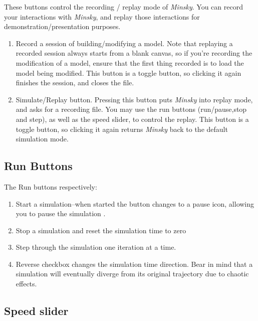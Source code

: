 \label{RecReplayButtons}


These buttons control the recording / replay mode of \emph{Minsky}.
You can record your interactions with \emph{Minsky}, and replay those
interactions for demonstration/presentation purposes.
\begin{enumerate}
\item Record a session of building/modifying a model. Note that replaying
a recorded session always starts from a blank canvas, so if you're
recording the modification of a model, ensure that the first thing
recorded is to load the model being modified. This button is a toggle
button, so clicking it again finishes the session, and closes the
file. 
\item Simulate/Replay button. Pressing this button puts \emph{Minsky} into
replay mode, and asks for a recording file. You may use the run buttons
(run/pause,stop and step), as well as the speed slider, to control
the replay. This button is a toggle button, so clicking it again returns
\emph{Minsky} back to the default simulation mode. 
\end{enumerate}

\subsection{Run Buttons}

\label{RunButtons}


The Run buttons respectively: 
\begin{enumerate}
\item Start a simulation--when started the button changes to a pause icon,
allowing you to pause the simulation . 
\item Stop a simulation and reset the simulation time to zero 
\item Step through the simulation one iteration at a time. 
\item Reverse checkbox changes the simulation time direction. Bear in mind
that a simulation will eventually diverge from its original trajectory
due to chaotic effects. 
\end{enumerate}

\subsection{Speed slider}

